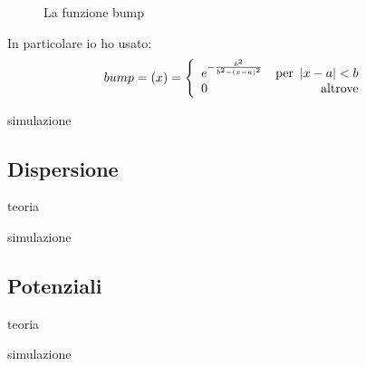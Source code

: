 \begin{figure}
	\centering
{}
	\caption{La funzione bump}
\end{figure}

In particolare io ho usato:
\begin{equation}\label{eq:mybump}
bump = \lrt{x} = \lr\{.{\begin{array}{lr}
	e^{-\frac{b^2}{b^2-\lrt{x-a}^2}}&\text{per }\lr||{x-a}<b\\
	0&\text{altrove}
	\end{array}}
\end{equation}

simulazione
\subsection{Dispersione}
teoria


simulazione
\subsection{Potenziali}
teoria

simulazione